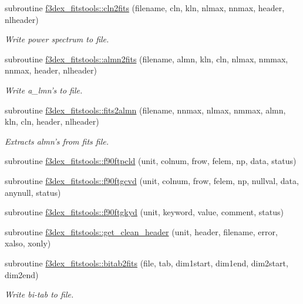 \begin{DoxyCompactItemize}
\item 
subroutine \hyperlink{namespacef3dex__fitstools_aab1f14e65c2837494cb15ff4fd54b372}{f3dex\_\-fitstools::cln2fits} (filename, cln, kln, nlmax, nnmax, header, nlheader)
\begin{DoxyCompactList}\small\item\em Write power spectrum to file. \end{DoxyCompactList}\item 
subroutine \hyperlink{namespacef3dex__fitstools_a3bb8fd149a1c137d3176d484e28bbef0}{f3dex\_\-fitstools::almn2fits} (filename, almn, kln, cln, nlmax, nmmax, nnmax, header, nlheader)
\begin{DoxyCompactList}\small\item\em Write a\_\-lmn's to file. \end{DoxyCompactList}\item 
subroutine \hyperlink{namespacef3dex__fitstools_a106cd0d1eb3bcd38d2c43228f499f57b}{f3dex\_\-fitstools::fits2almn} (filename, nnmax, nlmax, nmmax, almn, kln, cln, header, nlheader)
\begin{DoxyCompactList}\small\item\em Extracts almn's from fits file. \end{DoxyCompactList}\item 
subroutine \hyperlink{namespacef3dex__fitstools_a83e1158f828e86e43f1dc68bc0e7c59b}{f3dex\_\-fitstools::f90ftpcld} (unit, colnum, frow, felem, np, data, status)
\item 
subroutine \hyperlink{namespacef3dex__fitstools_ada7b447f4ace46eabf663495c3a8c8c2}{f3dex\_\-fitstools::f90ftgcvd} (unit, colnum, frow, felem, np, nullval, data, anynull, status)
\item 
subroutine \hyperlink{namespacef3dex__fitstools_ab7baecf48bb7833c32bc7be570f947c1}{f3dex\_\-fitstools::f90ftgkyd} (unit, keyword, value, comment, status)
\item 
subroutine \hyperlink{namespacef3dex__fitstools_a0d143b6a055e5c50c19b86e75d94c663}{f3dex\_\-fitstools::get\_\-clean\_\-header} (unit, header, filename, error, xalso, xonly)
\item 
subroutine \hyperlink{namespacef3dex__fitstools_ae6aed20f64a46bb7d9d33b1c56f89cd0}{f3dex\_\-fitstools::bitab2fits} (file, tab, dim1start, dim1end, dim2start, dim2end)
\begin{DoxyCompactList}\small\item\em Write bi-\/tab to file. \end{DoxyCompactList}\item 

\end{DoxyCompactItemize}
